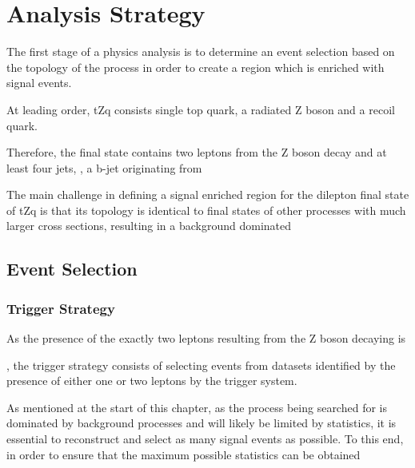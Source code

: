 \chapter{Analysis Strategy }\label{chapter:tzq-search}

The first stage of a physics analysis is to determine an event selection based on the topology of the process in order to create a region which is enriched with signal events.



At leading order, tZq consists single top quark, a radiated Z boson and a recoil quark.

Therefore, the final state contains two leptons from the Z boson decay and at least four jets, 
, a b-jet originating from 

The main challenge in defining a signal enriched region for the dilepton final state of tZq is that its topology is identical to final states of other processes with much larger cross sections, resulting in a background dominated


\section{Event Selection}\label{sec:eventSelection}

\subsection{Trigger Strategy}\label{subsec:triggerStrategy}
As the presence of the exactly two leptons resulting from the Z boson decaying is 
 
, the trigger strategy consists of selecting events from datasets identified by the presence of either one or two leptons by the trigger system.


As mentioned at the start of this chapter, as the process being searched for is dominated by background processes and will likely be limited by statistics, it is essential to reconstruct and select as many signal events as possible.
To this end, in order to ensure that the maximum possible statistics can be obtained

